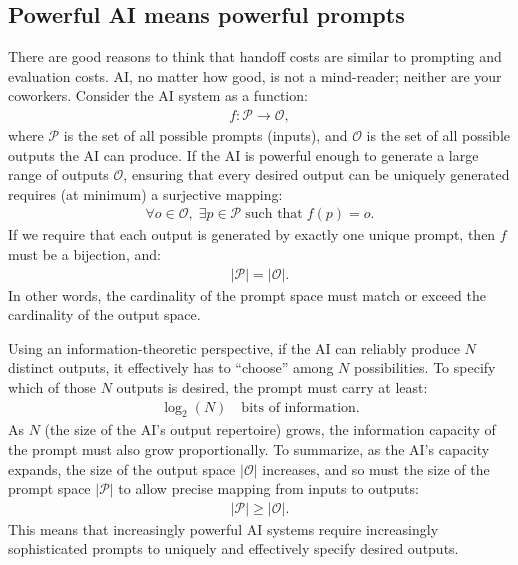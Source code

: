 \documentclass{article}
\theoremstyle{plain}
\theoremstyle{plain}
\begin{document}
\subsection{Powerful AI means powerful prompts}
There are good reasons to think that handoff costs are similar to prompting and evaluation costs.
AI, no matter how good, is not a mind-reader; neither are your coworkers.
Consider the AI system as a function:
\begin{align}
f : \mathcal{P} \longrightarrow \mathcal{O},
\end{align}
where \(\mathcal{P}\) is the set of all possible prompts (inputs), and \(\mathcal{O}\) is the set of all possible outputs the AI can produce.
If the AI is powerful enough to generate a large range of outputs \(\mathcal{O}\), ensuring that every desired output can be uniquely generated requires (at minimum) a surjective mapping:
\begin{align}
\forall o \in \mathcal{O}, \; \exists p \in \mathcal{P} \; \text{such that} \; f(p) = o.
\end{align}
If we require that each output is generated by exactly one unique prompt, then \(f\) must be a bijection, and:
\begin{align}
|\mathcal{P}| = |\mathcal{O}|.
\end{align}
In other words, the cardinality of the prompt space must match or exceed the cardinality of the output space.

Using an information-theoretic perspective, if the AI can reliably produce \(N\) distinct outputs, it effectively has to “choose” among \(N\) possibilities. 
To specify which of those \(N\) outputs is desired, the prompt must carry at least:
\begin{align}
\log_2(N) \quad \text{bits of information.}
\end{align}
As \(N\) (the size of the AI's output repertoire) grows, the information capacity of the prompt must also grow proportionally.
To summarize, as the AI’s capacity expands, the size of the output space \(|\mathcal{O}|\) increases, and so must the size of the prompt space \(|\mathcal{P}|\) to allow precise mapping from inputs to outputs:
\begin{align}
|\mathcal{P}| \geq |\mathcal{O}|.
\end{align}
This means that increasingly powerful AI systems require increasingly sophisticated prompts to uniquely and effectively specify desired outputs.
\end{document}
